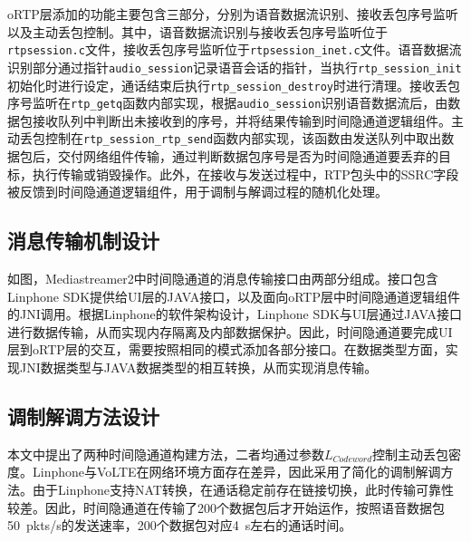 oRTP层添加的功能主要包含三部分，分别为语音数据流识别、接收丢包序号监听以及主动丢包控制。其中，语音数据流识别与接收丢包序号监听位于\texttt{rtpsession.c}文件，接收丢包序号监听位于\texttt{rtpsession\_inet.c}文件。语音数据流识别部分通过指针\texttt{audio\_session}记录语音会话的指针，当执行\texttt{rtp\_session\_init}初始化时进行设定，通话结束后执行\texttt{rtp\_session\_destroy}时进行清理。接收丢包序号监听在\texttt{rtp\_getq}函数内部实现，根据\texttt{audio\_session}识别语音数据流后，由数据包接收队列中判断出未接收到的序号，并将结果传输到时间隐通道逻辑组件。主动丢包控制在\texttt{rtp\_session\_rtp\_send}函数内部实现，该函数由发送队列中取出数据包后，交付网络组件传输，通过判断数据包序号是否为时间隐通道要丢弃的目标，执行传输或销毁操作。此外，在接收与发送过程中，RTP包头中的SSRC字段被反馈到时间隐通道逻辑组件，用于调制与解调过程的随机化处理。

\subsection{消息传输机制设计}
\label{chap:linphone:designation:data}


如图，Mediastreamer2中时间隐通道的消息传输接口由两部分组成。接口包含Linphone SDK提供给UI层的JAVA接口，以及面向oRTP层中时间隐通道逻辑组件的JNI调用。根据Linphone的软件架构设计，Linphone SDK与UI层通过JAVA接口进行数据传输，从而实现内存隔离及内部数据保护。因此，时间隐通道要完成UI层到oRTP层的交互，需要按照相同的模式添加各部分接口。在数据类型方面，实现JNI数据类型与JAVA数据类型的相互转换，从而实现消息传输。

\subsection{调制解调方法设计}
\label{chap:linphone:designation:modulation}

本文中提出了两种时间隐通道构建方法，二者均通过参数$L_{Codeword}$控制主动丢包密度。Linphone与VoLTE在网络环境方面存在差异，因此采用了简化的调制解调方法。由于Linphone支持NAT转换，在通话稳定前存在链接切换，此时传输可靠性较差。因此，时间隐通道在传输了200个数据包后才开始运作，按照语音数据包{50\ pkts/s}的发送速率，200个数据包对应{4\ s}左右的通话时间。

